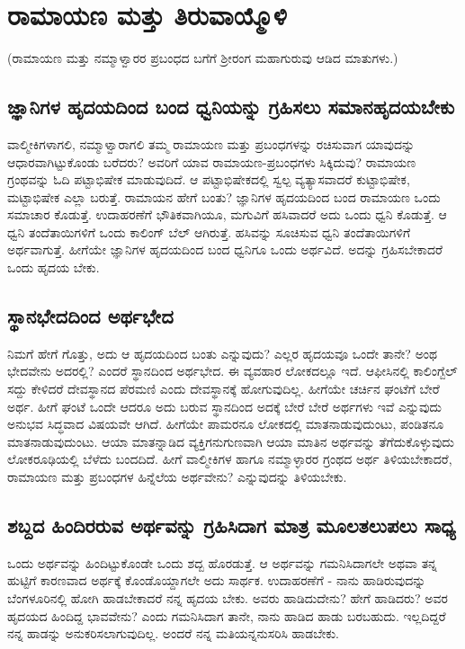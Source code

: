 \chapter{ರಾಮಾಯಣ ಮತ್ತು ತಿರುವಾಯ್ಮೊಳಿ}

(ರಾಮಾಯಣ ಮತ್ತು ನಮ್ಮಾಳ್ವಾರರ ಪ್ರಬಂಧದ ಬಗೆಗೆ ಶ್ರೀರಂಗ ಮಹಾಗುರುವು ಆಡಿದ ಮಾತುಗಳು.)

\section*{ಜ್ಞಾನಿಗಳ ಹೃದಯದಿಂದ ಬಂದ ಧ್ವನಿಯನ್ನು ಗ್ರಹಿಸಲು ಸಮಾನಹೃದಯಬೇಕು}

ವಾಲ್ಮೀಕಿಗಳಾಗಲಿ, ನಮ್ಮಾಳ್ವಾರಾಗಲಿ ತಮ್ಮ ರಾಮಾಯಣ ಮತ್ತು ಪ್ರಬಂಧಗಳನ್ನು ರಚಿಸುವಾಗ ಯಾವುದನ್ನು ಆಧಾರವಾಗಿಟ್ಟುಕೊಂಡು ಬರೆದರು? ಅವರಿಗೆ ಯಾವ ರಾಮಾಯಣ-ಪ್ರಬಂಧಗಳು ಸಿಕ್ಕಿದುವು? ರಾಮಾಯಣ ಗ್ರಂಥವನ್ನು ಓದಿ ಪಟ್ಟಾಭಿಷೇಕ ಮಾಡುವುದಿದೆ. ಆ ಪಟ್ಟಾಭಿಷೇಕದಲ್ಲಿ ಸ್ವಲ್ಪ ವ್ಯತ್ಯಾಸವಾದರೆ ಕುಟ್ಟಾಭಿಷೇಕ, ಮಟ್ಟಾಭಿಷೇಕ ಎಲ್ಲಾ ಬರುತ್ತೆ. ರಾಮಾಯನ ಹೇಗೆ ಬಂತು? ಜ್ಞಾನಿಗಳ ಹೃದಯದಿಂದ ಬಂದ ರಾಮಾಯಣ ಒಂದು ಸಮಾಚಾರ ಕೊಡುತ್ತೆ. ಉದಾಹರಣೆಗೆ ಭೌತಿಕವಾಗಿಯೂ, ಮಗುವಿಗೆ ಹಸಿವಾದರೆ ಅದು ಒಂದು ಧ್ವನಿ ಕೊಡುತ್ತೆ. ಆ ಧ್ವನಿ ತಂದೆತಾಯಿಗಳಿಗೆ ಒಂದು ಕಾಲಿಂಗ್ ಬೆಲ್ ಆಗಿರುತ್ತೆ. ಹಸಿವನ್ನು ಸೂಚಿಸುವ ಧ್ವನಿ ತಂದೆತಾಯಿಗಳಿಗೆ ಅರ್ಥವಾಗುತ್ತೆ. ಹೀಗೆಯೇ ಜ್ಞಾನಿಗಳ ಹೃದಯದಿಂದ ಬಂದ ಧ್ವನಿಗೂ ಒಂದು ಅರ್ಥವಿದೆ. ಅದನ್ನು ಗ್ರಹಿಸಬೇಕಾದರೆ ಒಂದು ಹೃದಯ ಬೇಕು.

\section*{ಸ್ಥಾನಭೇದದಿಂದ ಅರ್ಥಭೇದ}

ನಿಮಗೆ ಹೇಗೆ ಗೊತ್ತು, ಅದು ಆ ಹೃದಯದಿಂದ ಬಂತು ಎನ್ನುವುದು? ಎಲ್ಲರ ಹೃದಯವೂ ಒಂದೇ ತಾನೇ? ಅಂಥ ಭೇದವೇನು ಅದರಲ್ಲಿ? ಎಂದರೆ ಸ್ಥಾನದಿಂದ ಅರ್ಥಭೇದ. ಈ ವ್ಯವಹಾರ ಲೋಕದಲ್ಲೂ ಇದೆ. ಆಫೀಸಿನಲ್ಲಿ ಕಾಲಿಂಗ್ಬೆಲ್ ಸದ್ದು ಕೇಳಿದರೆ ದೇವಸ್ಥಾನದ ಪೆರಮಣಿ ಎಂದು ದೇವಸ್ಥಾನಕ್ಕೆ ಹೋಗುವುದಿಲ್ಲ. ಹೀಗೆಯೇ ಚರ್ಚಿನ ಘಂಟೆಗೆ ಬೇರೆ ಅರ್ಥ. ಹೀಗೆ ಘಂಟೆ ಒಂದೇ ಆದರೂ ಅದು ಬರುವ ಸ್ಥಾನದಿಂದ ಅದಕ್ಕೆ ಬೇರೆ ಬೇರೆ ಅರ್ಥಗಳು ಇವೆ ಎನ್ನುವುದು ಅನುಭವ ಸಿದ್ಧವಾದ ವಿಷಯವೇ ಆಗಿದೆ. ಹೀಗೆಯೇ ಪಾಮರನೂ ಲೋಕದಲ್ಲಿ ಮಾತನಾಡುವುದುಂಟು, ಪಂಡಿತನೂ ಮಾತನಾಡುವುದುಂಟು. ಆಯಾ‌ ಮಾತನ್ನಾಡಿದ ವ್ಯಕ್ತಿಗನುಗುಣವಾಗಿ ಆಯಾ ಮಾತಿನ ಅರ್ಥವನ್ನು ತೆಗೆದುಕೊಳ್ಳುವುದು ಲೋಕರೂಢಿಯಲ್ಲಿ ಬೆಳೆದು ಬಂದದಿದೆ. ಹೀಗೆ ವಾಲ್ಮೀಕಿಗಳ ಹಾಗೂ ನಮ್ಮಾಳ್ಳಾರರ ಗ್ರಂಥದ ಅರ್ಥ ತಿಳಿಯಬೇಕಾದರೆ, ರಾಮಾಯಣ ಮತ್ತು ಪ್ರಬಂಧಗಳ ಹಿನ್ನೆಲೆಯ ಅರ್ಥವೇನು? ಎನ್ನುವುದನ್ನು ತಿಳಿಯಬೇಕು. 


\section*{ಶಬ್ದದ ಹಿಂದಿರರುವ ಅರ್ಥವನ್ನು ಗ್ರಹಿಸಿದಾಗ ಮಾತ್ರ ಮೂಲತಲುಪಲು ಸಾಧ್ಯ}

ಒಂದು ಅರ್ಥವನ್ನು ಹಿಂದಿಟ್ಟುಕೊಂಡೇ ಒಂದು ಶದ್ಬ ಹೊರಡುತ್ತೆ. ಆ ಅರ್ಥವನ್ನು ಗಮನಿಸಿದಾಗಲೇ ಅಥವಾ ತನ್ನ ಹುಟ್ಟಿಗೆ ಕಾರಣವಾದ ಅರ್ಥಕ್ಕೆ  ಕೊಂಡೊಯ್ದಾಗಲೇ ಅದು ಸಾರ್ಥಕ. ಉದಾಹರಣೆಗೆ - ನಾನು ಹಾಡಿರುವುದನ್ನು ಬೆಂಗಳೂರಿನಲ್ಲಿ ಹೋಗಿ ಹಾಡಬೇಕಾದರೆ ನನ್ನ ಹೃದಯ ಬೇಕು. ಅವರು ಹಾಡಿದುದೇನು? ಹೇಗೆ ಹಾಡಿದರು? ಅವರ ಹೃದಯದ ಹಿಂದಿದ್ದ ಭಾವವೇನು? ಎಂದು ಗಮನಿಸಿದಾಗ ತಾನೇ, ನಾನು ಹಾಡಿದ ಹಾಡು ಬರಬಹುದು. ಇಲ್ಲದಿದ್ದರೆ ನನ್ನ ಹಾಡನ್ನು ಅನುಕರಿಸಲಾಗುವುದಿಲ್ಲ. ಅಂದರೆ ನನ್ನ ಮತಿಯನ್ನನುಸರಿಸಿ ಹಾಡಬೇಕು.

